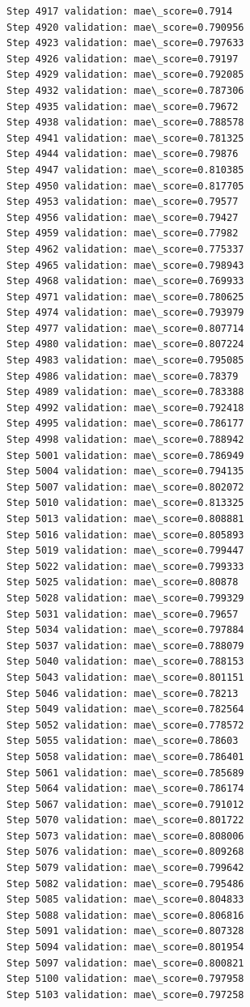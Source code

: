 \documentclass[11pt]{article}
\begin{document}
\begin{Verbatim}[commandchars=\\\{\}]
Step 4917 validation: mae\_score=0.7914
Step 4920 validation: mae\_score=0.790956
Step 4923 validation: mae\_score=0.797633
Step 4926 validation: mae\_score=0.79197
Step 4929 validation: mae\_score=0.792085
Step 4932 validation: mae\_score=0.787306
Step 4935 validation: mae\_score=0.79672
Step 4938 validation: mae\_score=0.788578
Step 4941 validation: mae\_score=0.781325
Step 4944 validation: mae\_score=0.79876
Step 4947 validation: mae\_score=0.810385
Step 4950 validation: mae\_score=0.817705
Step 4953 validation: mae\_score=0.79577
Step 4956 validation: mae\_score=0.79427
Step 4959 validation: mae\_score=0.77982
Step 4962 validation: mae\_score=0.775337
Step 4965 validation: mae\_score=0.798943
Step 4968 validation: mae\_score=0.769933
Step 4971 validation: mae\_score=0.780625
Step 4974 validation: mae\_score=0.793979
Step 4977 validation: mae\_score=0.807714
Step 4980 validation: mae\_score=0.807224
Step 4983 validation: mae\_score=0.795085
Step 4986 validation: mae\_score=0.78379
Step 4989 validation: mae\_score=0.783388
Step 4992 validation: mae\_score=0.792418
Step 4995 validation: mae\_score=0.786177
Step 4998 validation: mae\_score=0.788942
Step 5001 validation: mae\_score=0.786949
Step 5004 validation: mae\_score=0.794135
Step 5007 validation: mae\_score=0.802072
Step 5010 validation: mae\_score=0.813325
Step 5013 validation: mae\_score=0.808881
Step 5016 validation: mae\_score=0.805893
Step 5019 validation: mae\_score=0.799447
Step 5022 validation: mae\_score=0.799333
Step 5025 validation: mae\_score=0.80878
Step 5028 validation: mae\_score=0.799329
Step 5031 validation: mae\_score=0.79657
Step 5034 validation: mae\_score=0.797884
Step 5037 validation: mae\_score=0.788079
Step 5040 validation: mae\_score=0.788153
Step 5043 validation: mae\_score=0.801151
Step 5046 validation: mae\_score=0.78213
Step 5049 validation: mae\_score=0.782564
Step 5052 validation: mae\_score=0.778572
Step 5055 validation: mae\_score=0.78603
Step 5058 validation: mae\_score=0.786401
Step 5061 validation: mae\_score=0.785689
Step 5064 validation: mae\_score=0.786174
Step 5067 validation: mae\_score=0.791012
Step 5070 validation: mae\_score=0.801722
Step 5073 validation: mae\_score=0.808006
Step 5076 validation: mae\_score=0.809268
Step 5079 validation: mae\_score=0.799642
Step 5082 validation: mae\_score=0.795486
Step 5085 validation: mae\_score=0.804833
Step 5088 validation: mae\_score=0.806816
Step 5091 validation: mae\_score=0.807328
Step 5094 validation: mae\_score=0.801954
Step 5097 validation: mae\_score=0.800821
Step 5100 validation: mae\_score=0.797958
Step 5103 validation: mae\_score=0.797258

\end{Verbatim}
\end{document}

